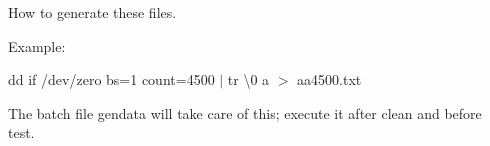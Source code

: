 How to generate these files.

Example\+:

dd if /dev/zero bs=1 count=4500 $\vert$ tr \textbackslash{}0 a $>$ aa4500.\+txt

The batch file gendata will take care of this; execute it after clean and before test. 